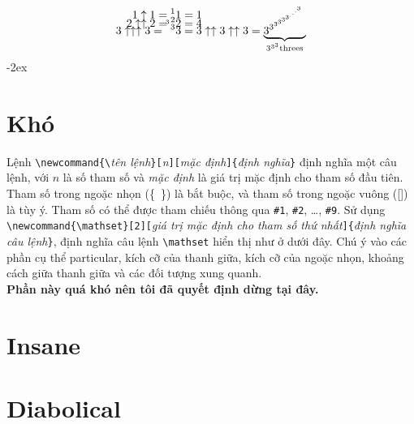 \documentclass[a4paper,12pt,notitlepage]{article}
\begin{document}
	\begin{align}
		1 \uparrow 1 = {^1}1 &= 1 \nonumber \\[-2ex]
		2 \uparrow \uparrow 2 = {^2}2 &= 4 \nonumber \\[-2ex]
		3 \uparrow \uparrow \uparrow 3 = \smash{{^{^{^3}3}}3} %
		&= 3 \uparrow \uparrow 3 \uparrow \uparrow 3 = \underbrace{\smash{3^{3^{3^{3^{3^{3^{.^{.^{.^{3}}}}}}}}}}}_{3^{3^3} \text{threes}}
	\end{align}
	\newpage
	\openup -2ex
	\section{Khó}
	Lệnh \verb+\newcommand{\+\textit{tên lệnh}\verb+}[+\textit{n}\verb+][+\textit{mặc định}\verb+]{+\textit{định nghĩa}\verb+}+ định nghĩa một câu lệnh, với $n$ là
	số tham số và \textit{mặc định} là giá trị mặc định cho tham số đầu tiên.
	Tham số trong ngoặc nhọn \mbox{(\{ {} \})} là bắt buộc, và tham số trong ngoặc vuông ([\phantom{a}]) là tùy ý. 
	Tham số có thể được tham chiếu thông qua \verb|#1|, \verb|#2|, \ldots , \verb|#9|. 
	Sử dụng \verb+\newcommand{\mathset}[2][+\textit{giá trị mặc định cho tham số thứ nhất}\verb+]{+\textit{định nghĩa câu lệnh}\verb+}+, định nghĩa câu lệnh \verb+\mathset+ hiển thị như ở dưới đây. 
	Chú ý vào các phần cụ thể particular, kích cỡ của thanh giữa, kích cỡ của ngoặc nhọn, khoảng cách giữa thanh giữa và các đối tượng xung quanh. \\
	\textbf{Phần này quá khó nên tôi đã quyết định dừng tại đây.}
	\section{Insane}
	\section{Diabolical}
\end{document}
